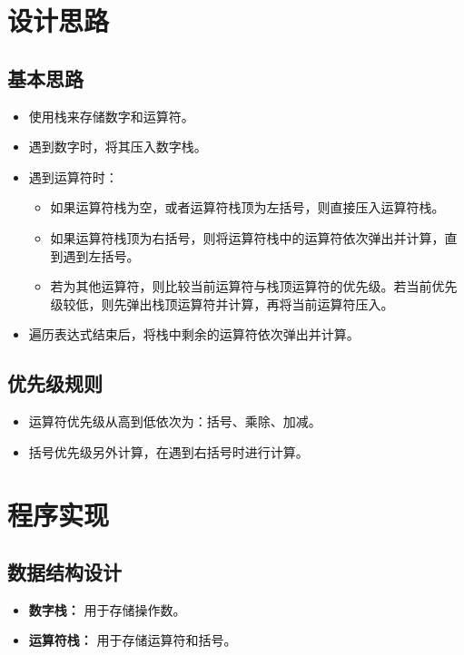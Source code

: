 \documentclass[UTF8]{ctexart}
\begin{document}
\pagestyle{fancy}
\fancyhead{}
\rhead{\today}

\section{设计思路}
\subsection{基本思路}
\begin{itemize}
    \item 使用栈来存储数字和运算符。
    \item 遇到数字时，将其压入数字栈。
    \item 遇到运算符时：
    \begin{itemize}
        \item 如果运算符栈为空，或者运算符栈顶为左括号，则直接压入运算符栈。
        \item 如果运算符栈顶为右括号，则将运算符栈中的运算符依次弹出并计算，直到遇到左括号。
        \item 若为其他运算符，则比较当前运算符与栈顶运算符的优先级。若当前优先级较低，则先弹出栈顶运算符并计算，再将当前运算符压入。
    \end{itemize}
    \item 遍历表达式结束后，将栈中剩余的运算符依次弹出并计算。
\end{itemize}

\subsection{优先级规则}
\begin{itemize}
    \item 运算符优先级从高到低依次为：括号、乘除、加减。
    \item 括号优先级另外计算，在遇到右括号时进行计算。
\end{itemize}

\section{程序实现}
\subsection{数据结构设计}
\begin{itemize}
    \item \textbf{数字栈：} 用于存储操作数。
    \item \textbf{运算符栈：} 用于存储运算符和括号。
\end{itemize}
\end{document}

